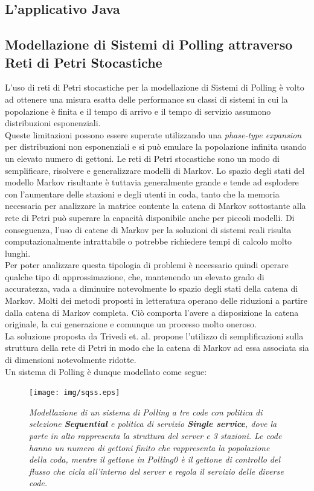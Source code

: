 \documentclass[12pt,a4paper,italian]{article}
\begin{document}
\subsection{L'applicativo Java}
\subsection{Modellazione di Sistemi di Polling attraverso Reti di Petri Stocastiche}
L'uso di reti di Petri stocastiche per la modellazione di Sistemi di Polling è volto ad ottenere una misura esatta delle performance su classi di sistemi in cui la popolazione è finita e il tempo di arrivo e il tempo di servizio assumono distribuzioni esponenziali.\\ Queste limitazioni possono essere superate utilizzando una \emph{phase-type expansion} per distribuzioni non esponenziali e si può emulare la popolazione infinita usando un elevato numero di gettoni\cite{fixedpoint}. Le reti di Petri stocastiche sono un modo di semplificare, risolvere e generalizzare modelli di Markov. Lo spazio degli stati del modello Markov risultante è tuttavia generalmente grande e tende ad esplodere con l'aumentare delle stazioni e degli utenti in coda, tanto che la memoria necessaria per analizzare la matrice contente la catena di Markov sottostante alla rete di Petri può superare la capacità disponibile anche per piccoli modelli. Di conseguenza, l'uso di catene di Markov per la soluzioni di sistemi reali risulta computazionalmente intrattabile o potrebbe richiedere tempi di calcolo molto lunghi\cite{pollingsys}.\\
Per poter analizzare questa tipologia di problemi è necessario quindi operare qualche tipo di approssimazione, che, mantenendo un elevato grado di accuratezza, vada a diminuire notevolmente lo spazio degli stati della catena di Markov. Molti dei metodi proposti in letteratura operano delle riduzioni a partire dalla catena di Markov completa. Ciò comporta l'avere a disposizione la catena originale, la cui generazione e comunque un processo molto oneroso.\\ La soluzione proposta da Trivedi et. al. propone l'utilizzo di semplificazioni sulla struttura della rete di Petri in modo che la catena di Markov ad essa associata sia di dimensioni notevolmente ridotte.\\
\newline
Un sistema di Polling è dunque modellato come segue:\\
\begin{figure}[!h]
	\centering
	\texttt{[image: img/sqss.eps]}
	\caption{\emph{Modellazione di un sistema di Polling a tre code con politica di selezione \textbf{Sequential} e politica di servizio \textbf{Single service}, dove la parte in alto rappresenta la struttura del server e 3 stazioni. Le code hanno un numero di gettoni finito che rappresenta la popolazione della coda, mentre il gettone in Polling0 è il gettone di controllo del flusso che cicla all'interno del server e regola il servizio delle diverse code.}}
	\label{sqss}
\end{figure}\\
\end{document}
